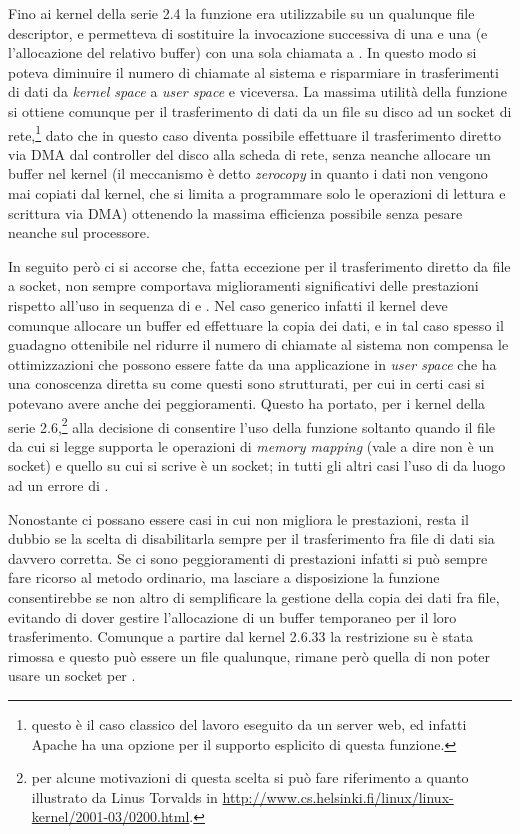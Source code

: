 Fino ai kernel della serie 2.4 la funzione era utilizzabile su un qualunque
file descriptor, e permetteva di sostituire la invocazione successiva di una
 e una  (e l'allocazione del relativo buffer) con una
sola chiamata a . In questo modo si poteva diminuire il numero
di chiamate al sistema e risparmiare in trasferimenti di dati da
\textit{kernel space} a \textit{user space} e viceversa.  La massima utilità
della funzione si ottiene comunque per il trasferimento di dati da un file su
disco ad un socket di rete,\footnote{questo è il caso classico del lavoro
  eseguito da un server web, ed infatti Apache ha una opzione per il supporto
  esplicito di questa funzione.} dato che in questo caso diventa possibile
effettuare il trasferimento diretto via DMA dal controller del disco alla
scheda di rete, senza neanche allocare un buffer nel kernel (il meccanismo è
detto \textit{zerocopy} in quanto i dati non vengono mai copiati dal kernel,
che si limita a programmare solo le operazioni di lettura e scrittura via DMA)
ottenendo la massima efficienza possibile senza pesare neanche sul processore.

In seguito però ci si accorse che, fatta eccezione per il trasferimento
diretto da file a socket, non sempre  comportava miglioramenti
significativi delle prestazioni rispetto all'uso in sequenza di  e
. Nel caso generico infatti il kernel deve comunque allocare un
buffer ed effettuare la copia dei dati, e in tal caso spesso il guadagno
ottenibile nel ridurre il numero di chiamate al sistema non compensa le
ottimizzazioni che possono essere fatte da una applicazione in \textit{user
  space} che ha una conoscenza diretta su come questi sono strutturati, per
cui in certi casi si potevano avere anche dei peggioramenti.  Questo ha
portato, per i kernel della serie 2.6,\footnote{per alcune motivazioni di
  questa scelta si può fare riferimento a quanto illustrato da Linus Torvalds
  in \url{http://www.cs.helsinki.fi/linux/linux-kernel/2001-03/0200.html}.}
alla decisione di consentire l'uso della funzione soltanto quando il file da
cui si legge supporta le operazioni di \textit{memory mapping} (vale a dire
non è un socket) e quello su cui si scrive è un socket; in tutti gli altri
casi l'uso di  da luogo ad un errore di .

Nonostante ci possano essere casi in cui  non migliora le
prestazioni, resta il dubbio se la scelta di disabilitarla sempre per il
trasferimento fra file di dati sia davvero corretta. Se ci sono peggioramenti
di prestazioni infatti si può sempre fare ricorso al metodo ordinario, ma
lasciare a disposizione la funzione consentirebbe se non altro di semplificare
la gestione della copia dei dati fra file, evitando di dover gestire
l'allocazione di un buffer temporaneo per il loro trasferimento. Comunque a
partire dal kernel 2.6.33 la restrizione su  è stata rimossa e
questo può essere un file qualunque, rimane però quella di non poter usare un
socket per .

